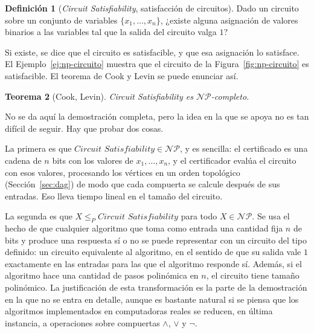 \documentclass[12pt, spanish, oneside, openany]{book}
\newcommand{\NP}{\mathcal{NP}}
\newcommand{\redp}{\le_{P}}
\newcommand{\prob}[1]{\textit{#1}}
\newcommand{\CSAT}{\prob{Circuit Satisfiability}\xspace}
\theoremstyle{uprightplain}
\newtheorem{teorema}{Teorema}[section]
\theoremstyle{definition}
\newtheorem{definicion}[teorema]{Definición}
\theoremstyle{remark}
\theoremstyle{definition}
\begin{document}
\begin{definicion}[\CSAT, satisfacción de circuitos]
\label{def:np-csat}
Dado un circuito sobre un conjunto de variables $\{x_1,\dots,x_n\}$, ¿existe alguna asignación de valores binarios a las variables tal que la salida del circuito valga $1$?
\end{definicion}

Si existe, se dice que el circuito es satisfacible, y que esa asignación lo satisface. El Ejemplo~\ref{ej:np-circuito} muestra que el circuito de la Figura~\ref{fig:np-circuito} es satisfacible. El teorema de Cook y Levin se puede enunciar así.

\begin{teorema}[Cook, Levin]
\label{teo:np-cook-levin}
\CSAT es $\NP$-completo.
\end{teorema}

No se da aquí la demostración completa, pero la idea en la que se apoya no es tan difícil de seguir. Hay que probar dos cosas.

La primera es que $\CSAT\in\NP$, y es sencilla: el certificado es una cadena de $n$ bits con los valores de $x_1,\dots,x_n$, y el certificador evalúa el circuito con esos valores, procesando los vértices en un orden topológico (Sección~\ref{sec:dag}) de modo que cada compuerta se calcule después de sus entradas. Eso lleva tiempo lineal en el tamaño del circuito.

La segunda es que $X\redp\CSAT$ para todo $X\in\NP$. Se usa el hecho de que cualquier algoritmo que toma como entrada una cantidad fija $n$ de bits y produce una respuesta sí o no se puede representar con un circuito del tipo definido: un circuito equivalente al algoritmo, en el sentido de que su salida vale $1$ exactamente en las entradas para las que el algoritmo responde sí. Además, si el algoritmo hace una cantidad de pasos polinómica en $n$, el circuito tiene tamaño polinómico. La justificación de esta transformación es la parte de la demostración en la que no se entra en detalle, aunque es bastante natural si se piensa que los algoritmos implementados en computadoras reales se reducen, en última instancia, a operaciones sobre compuertas $\wedge$, $\vee$ y $\neg$.
\end{document}
